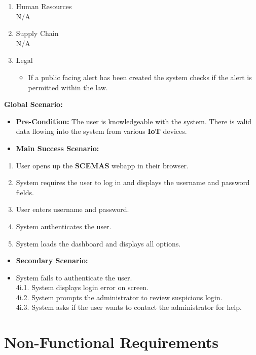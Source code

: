 \documentclass[]{article}
\begin{document}
\begin{enumerate}[{\bf BE1.}]
\begin{enumerate}[{\bf VP1.}]
			N/A
		\item Human Resources \\
			N/A
		\item Supply Chain \\
			N/A
		\item Legal
			\begin{itemize}
				\item[11i.] If a public facing alert has been created the system checks if the alert is permitted within the law.
			\end{itemize}
		\end{enumerate}
		{\bf Global Scenario:}
		\begin{itemize}
			\item[] {\bf Pre-Condition:} The user is knowledgeable with the system. There is valid data flowing into the system from various \textbf{IoT} devices.
			\item[] {\bf Main Success Scenario:}
		\end{itemize}
		\begin{enumerate}[1.]
			\item User opens up the \textbf{SCEMAS} webapp in their browser.
			\item System requires the user to log in and displays the username and password fields.
			\item User enters username and password.
			\item System authenticates the user.
			\item System loads the dashboard and displays all options.
		\end{enumerate}
		\begin{itemize}
			\item[] {\bf Secondary Scenario:}
			\item[4i.] System fails to authenticate the user. \\
			\hspace{1cm}4i.1. System displays login error on screen. \\
			\hspace{1cm}4i.2. System prompts the administrator to review suspicious login. \\
			\hspace{1cm}4i.3. System asks if the user wants to contact the administrator for help.
		\end{itemize}
\end{enumerate}




\section{Non-Functional Requirements}
\label{sec:non-functional_requirements}
\end{document}

